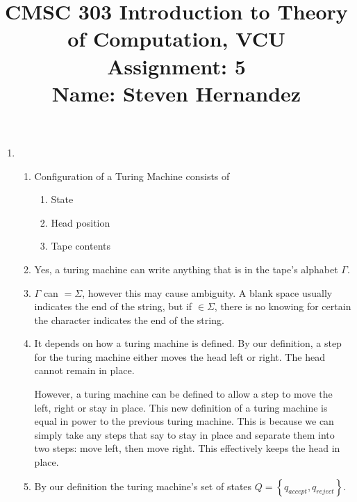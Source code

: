 \documentclass{article}
\newcommand{\set}[1]{{\left\{#1\right\}}}    %
\begin{document}
\title{
    CMSC 303 Introduction to Theory of Computation, VCU\\
    Assignment: 5\\
    Name: Steven Hernandez
}

\date{}

\maketitle
\vspace{-10mm}

\begin{enumerate}
    \item %
        \begin{enumerate}
            \item
                Configuration of a Turing Machine consists of

                \begin{enumerate}
                    \item
                        State
                    \item
                        Head position
                    \item
                        Tape contents
                \end{enumerate}
            \item
                Yes, a turing machine can write anything that is in the tape's alphabet $\Gamma$.
            \item
                $\Gamma$ can $ = \Sigma$, however this may cause ambiguity.
                A blank space usually indicates the end of the string, but if \textvisiblespace $\in \Sigma$, there is no knowing for certain the character indicates the end of the string.
            \item
                It depends on how a turing machine is defined.
                By our definition, a step for the turing machine either moves the head left or right.
                The head cannot remain in place.

                However, a turing machine can be defined to allow a step to move the left, right or stay in place.
                This new definition of a turing machine is equal in power to the previous turing machine.
                This is because we can simply take any steps that say to stay in place and separate them into two steps:
                move left, then move right.
                This effectively keeps the head in place.
            \item
                By our definition the turing machine's set of states $Q = \set{q_{accept}, q_{reject}}$.


\end{enumerate}
\end{enumerate}
\end{document}
